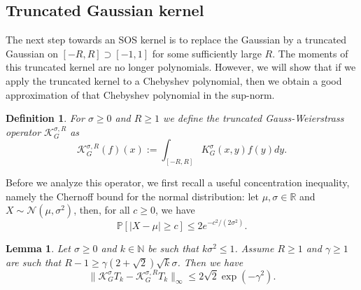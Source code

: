 \documentclass[11pt]{article}
\newcommand{\N}{\mathbb{N}}
\newcommand{\R}{\mathbb{R}}
\newtheorem{definition}[defin]{Definition}
\newtheorem{lemma}[defin]{Lemma}
\theoremstyle{definition}
\begin{document}
\subsection{Truncated Gaussian kernel}
\label{sec:truncated}
The next step towards an SOS kernel is to replace the Gaussian by a truncated Gaussian on $[-R,R] \supset [-1,1]$ for some sufficiently large $R$. The moments of this truncated kernel are no longer polynomials. However, we will show that if we apply the truncated kernel to a Chebyshev polynomial, then we obtain a good approximation of that Chebyshev polynomial in the sup-norm.

\begin{definition}
    For $\sigma \geq 0$ and $R \geq 1$ we define the \textit{truncated Gauss-Weierstrass} operator $\mathcal K_G^{\sigma,R}$ as
\[
 \mathcal{K}^{\sigma,R}_G(f)(x) := \int_{[-R,R]} K^\sigma_G(x,y)f(y)dy.
\]
\end{definition}

Before we analyze this operator, we first recall a useful concentration inequality, {namely the Chernoff bound \cite{Chernoff} for the normal distribution:}
    let $\mu, \sigma \in \R$ and $X \sim \mathcal N(\mu,\sigma^2)$, then, for all $c \geq 0$, we have
    \begin{equation} \label{eq:concentration}
    \mathbb P[|X-\mu| \geq c ] \leq 2 e^{-c^2/(2\sigma^2)}.
    \end{equation}


\begin{lemma} \label{lem:truncate}
Let $\sigma \geq 0$ and $k \in \N$ be such that $k \sigma^2 \leq 1$. Assume $R \geq 1$ and $\gamma \geq 1$ are such that  $R -1 \geq \gamma (2+\sqrt{2})\sqrt{k}\sigma$. Then we have
\[
\|\mathcal K_G^{\sigma} T_k - \mathcal K_G^{\sigma,R} T_k \|_\infty \leq 2 \sqrt{2} \exp(-\gamma^2).
\]
\end{lemma}
\end{document}

